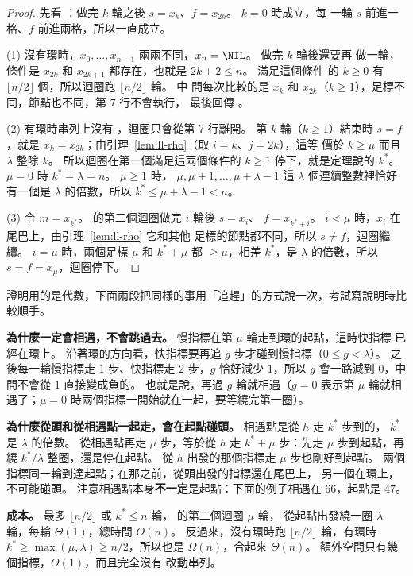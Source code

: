 \begin{proof}
先看 ：做完 $k$ 輪之後 $s = x_k$、$f = x_{2k}$。 $k = 0$ 時成立，每
一輪 $s$ 前進一格、$f$ 前進兩格，所以一直成立。

(1) 沒有環時，$x_0, \ldots, x_{n-1}$ 兩兩不同，$x_n = \NIL$。 做完 $k$ 輪後還要再
做一輪，條件是 $x_{2k}$ 和 $x_{2k+1}$ 都存在，也就是 $2k + 2 \le n$。 滿足這個條件
的 $k \ge 0$ 有 $\lfloor n/2 \rfloor$ 個，所以迴圈跑 $\lfloor n/2 \rfloor$ 輪。 中
間每次比較的是 $x_k$ 和 $x_{2k}$（$k \ge 1$），足標不同，節點也不同，第 7 行不會執行，
最後回傳 \NIL。

(2) 有環時串列上沒有 \NIL，迴圈只會從第 7 行離開。 第 $k$ 輪（$k \ge 1$）結束時
$s = f$，就是 $x_k = x_{2k}$；由引理~\ref{lem:ll-rho}（取 $i = k$、$j = 2k$），這等
價於 $k \ge \mu$ 而且 $\lambda$ 整除 $k$。 所以迴圈在第一個滿足這兩個條件的 $k \ge 1$
停下，就是定理說的 $k^*$。 $\mu = 0$ 時 $k^* = \lambda = n$。 $\mu \ge 1$ 時，
$\mu, \mu + 1, \ldots, \mu + \lambda - 1$ 這 $\lambda$ 個連續整數裡恰好有一個是
$\lambda$ 的倍數，所以 $k^* \le \mu + \lambda - 1 < n$。

(3) 令 $m = x_{k^*}$。  的第二個迴圈做完 $i$ 輪後 $s = x_i$、
$f = x_{k^* + i}$。 $i < \mu$ 時，$x_i$ 在尾巴上，由引理~\ref{lem:ll-rho} 它和其他
足標的節點都不同，所以 $s \ne f$，迴圈繼續。 $i = \mu$ 時，兩個足標 $\mu$ 和 $k^* +
\mu$ 都 $\ge \mu$，相差 $k^*$，是 $\lambda$ 的倍數，所以 $s = f = x_\mu$，迴圈停下。
\end{proof}

證明用的是代數，下面兩段把同樣的事用「追趕」的方式說一次，考試寫說明時比較順手。

\textbf{為什麼一定會相遇，不會跳過去。} 慢指標在第 $\mu$ 輪走到環的起點，這時快指標
已經在環上。 沿著環的方向看，快指標要再追 $g$ 步才碰到慢指標（$0 \le g < \lambda$）。
之後每一輪慢指標走 $1$ 步、快指標走 $2$ 步，$g$ 恰好減少 $1$，所以 $g$ 會一路減到
$0$，中間不會從 $1$ 直接變成負的。 也就是說，再過 $g$ 輪就相遇（$g = 0$ 表示第 $\mu$
輪就相遇了；$\mu = 0$ 時兩個指標一開始就在一起，要等繞完第一圈）。

\textbf{為什麼從頭和從相遇點一起走，會在起點碰頭。} 相遇點是從 $h$ 走 $k^*$ 步到的，
$k^*$ 是 $\lambda$ 的倍數。 從相遇點再走 $\mu$ 步，等於從 $h$ 走 $k^* + \mu$ 步：先走
$\mu$ 步到起點，再繞 $k^* / \lambda$ 整圈，還是停在起點。 從 $h$ 出發的那個指標走
$\mu$ 步也剛好到起點。 兩個指標同一輪到達起點；在那之前，從頭出發的指標還在尾巴上，
另一個在環上，不可能碰頭。 注意相遇點本身\textbf{不一定}是起點：下面的例子相遇在
$66$，起點是 $47$。

\textbf{成本。}  最多 $\lfloor n/2 \rfloor$ 或 $k^* \le n$ 輪，
 的第二個迴圈 $\mu$ 輪， 從起點出發繞一圈
$\lambda$ 輪，每輪 $\Theta(1)$，總時間 $O(n)$。 反過來，沒有環時跑
$\lfloor n/2 \rfloor$ 輪，有環時 $k^* \ge \max(\mu, \lambda) \ge n/2$，所以也是
$\Omega(n)$，合起來 $\Theta(n)$。 額外空間只有幾個指標，$\Theta(1)$，而且完全沒有
改動串列。

